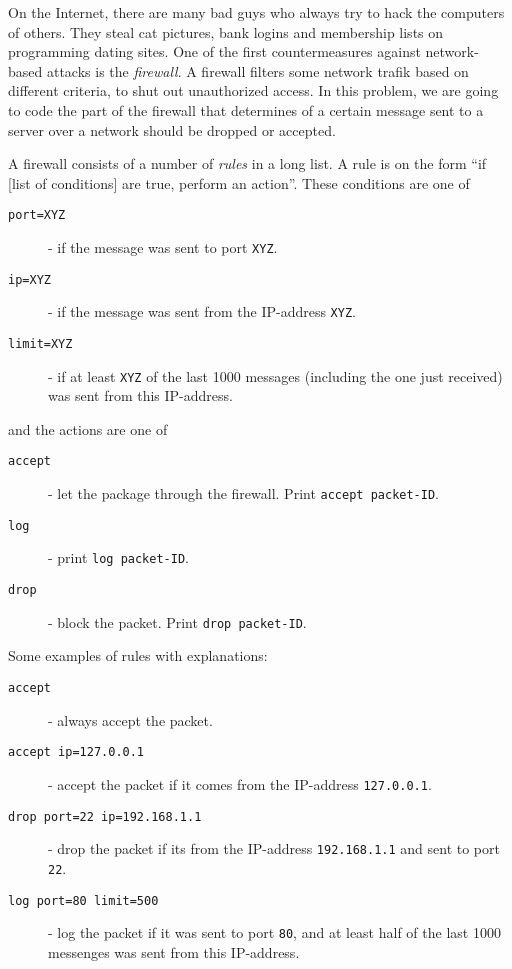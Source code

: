 
On the Internet, there are many bad guys who always try to hack the computers of others. They steal cat pictures, bank logins and membership lists on programming dating sites. One of the first countermeasures against network-based attacks is the \emph{firewall}. A firewall filters some network trafik based on different criteria, to shut out unauthorized access. In this problem, we are going to code the part of the firewall that determines of a certain message sent to a server over a network should be dropped or accepted.

A firewall consists of a number of \emph{rules} in a long list. A rule is on the form ``if [list of conditions] are true, perform an action''. These conditions are one of

\begin{description}
	\item[\texttt{port=XYZ}] - if the message was sent to port \texttt{XYZ}.
	\item[\texttt{ip=XYZ}] - if the message was sent from the IP-address \texttt{XYZ}.
	\item[\texttt{limit=XYZ}] - if at least \texttt{XYZ} of the last 1000 messages (including the one just received) was sent from this IP-address.
\end{description}

and the actions are one of

\begin{description}
	\item[\texttt{accept}] - let the package through the firewall. Print \texttt{accept packet-ID}.
	\item[\texttt{log}] - print \texttt{log packet-ID}.
	\item[\texttt{drop}] - block the packet. Print \texttt{drop packet-ID}.
\end{description}

Some examples of rules with explanations:
\begin{description}
	\item[\texttt{accept}] - always accept the packet.
	\item[\texttt{accept ip=127.0.0.1}] - accept the packet if it comes from the IP-address \texttt{127.0.0.1}.
	\item[\texttt{drop port=22 ip=192.168.1.1}] - drop the packet if its from the IP-address \texttt{192.168.1.1} and sent to port \texttt{22}.
	\item[\texttt{log port=80 limit=500}] - log the packet if it was sent to port \texttt{80}, and at least half of the last 1000 messenges was sent from this IP-address.
\end{description}

